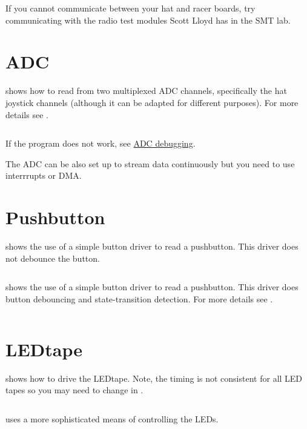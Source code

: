 If you cannot communicate between your hat and racer boards, try
communicating with the radio test modules Scott Lloyd has in the SMT
lab.


\section{ADC}
\label{ADC}

 shows
how to read from two multiplexed ADC channels, specifically the hat joystick
channels (although it can be adapted for different purposes).  For more details
see .

\inputminted{C}{../../src/test-apps/adc_usb_serial_test2/adc_usb_serial_test2.c}

If the program does not work, see  \hyperref[debugging-adc]{ADC debugging}.

The ADC can be also set up to stream data continuously but you need to
use interrrupts or DMA.


\section{Pushbutton}
\label{pushbutton}

 shows the use of a
simple button driver to read a pushbutton.  This driver does not debounce the button.

\inputminted{C}{../../src/test-apps/button_test1/button_test1.c}

 shows the use of a
simple button driver to read a pushbutton.  This driver does button
debouncing and state-transition detection.  For more details see
.

\inputminted{C}{../../src/test-apps/button_test2/button_test2.c}


\section{LEDtape}
\label{ledtape}

 shows how to drive the
LEDtape.  Note, the timing is not consistent for all LED tapes so you
may need to change  in .

\inputminted{C}{../../src/test-apps/ledtape_test1/ledtape_test1.c}


 uses a more
sophisticated means of controlling the LEDs.

\inputminted{C}{../../src/test-apps/ledtape_test2/ledtape_test2.c}
